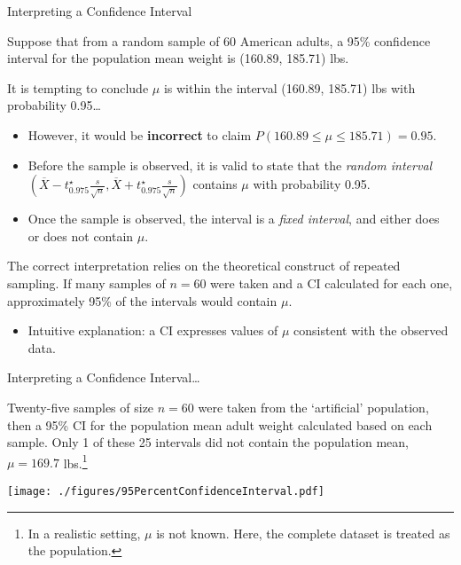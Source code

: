 \documentclass[
  ignorenonframetext,
  aspectratio=169]{beamer}
\providecommand{\tightlist}{%
  \setlength{\itemsep}{0pt}\setlength{\parskip}{0pt}}
\begin{document}
\begin{frame}{Interpreting a Confidence Interval}
\protect\hypertarget{interpreting-a-confidence-interval}{}
\small

Suppose that from a random sample of 60 American adults, a 95\%
confidence interval for the population mean weight is (160.89, 185.71)
lbs.

It is tempting to conclude \(\mu\) is within the interval (160.89,
185.71) lbs with probability 0.95\ldots{}

\begin{itemize}
\item
  However, it would be \textbf{incorrect} to claim
  \(P(160.89 \leq \mu \leq 185.71) = 0.95\).
\item
  Before the sample is observed, it is valid to state that the
  \emph{random interval}
  \((\overline{X} - t^\star_{0.975} \frac{s}{\sqrt{n}}, \overline{X} + t^\star_{0.975} \frac{s}{\sqrt{n}})\)
  contains \(\mu\) with probability 0.95.
\item
  Once the sample is observed, the interval is a \emph{fixed interval},
  and either does or does not contain \(\mu\).
\end{itemize}

The correct interpretation relies on the theoretical construct of
repeated sampling. If many samples of \(n = 60\) were taken and a CI
calculated for each one, approximately 95\% of the intervals would
contain \(\mu\).

\begin{itemize}
\tightlist
\item
  Intuitive explanation: a CI expresses values of \(\mu\) consistent
  with the observed data.
\end{itemize}

\normalsize
\end{frame}

\begin{frame}{Interpreting a Confidence Interval\ldots{}}
\protect\hypertarget{interpreting-a-confidence-interval-1}{}
\small

Twenty-five samples of size \(n = 60\) were taken from the `artificial'
population, then a 95\% CI for the population mean adult weight
calculated based on each sample. Only 1 of these 25 intervals did not
contain the population mean, \(\mu = 169.7\)
lbs.\footnote{In a realistic setting, $\mu$ is not known. Here, the complete dataset is treated as the population.}

\centering

\texttt{[image: ./figures/95PercentConfidenceInterval.pdf]}
\end{frame}
\end{document}
